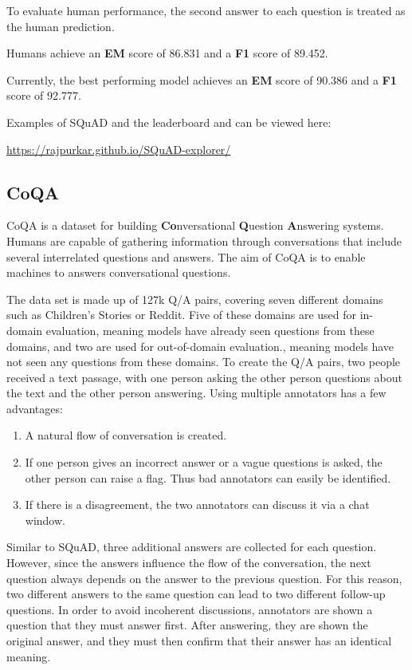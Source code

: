\documentclass[]{krantz}
\providecommand{\tightlist}{%
  \setlength{\itemsep}{0pt}\setlength{\parskip}{0pt}}
\begin{document}
To evaluate human performance, the second answer to each question is treated as the human prediction. \citep{rajpurkar2016squad, rajpurkar2018know}

Humans achieve an \textbf{EM} score of 86.831 and a \textbf{F1} score of 89.452.

Currently, the best performing model achieves an \textbf{EM} score of 90.386 and a \textbf{F1} score of 92.777.

Examples of SQuAD and the leaderboard and can be viewed here:

\center \url{https://rajpurkar.github.io/SQuAD-explorer/}

\flushleft

\hypertarget{coqa}{%
\subsection{CoQA}\label{coqa}}

CoQA is a dataset for building \textbf{Co}nversational \textbf{Q}uestion \textbf{A}nswering systems. Humans are capable of gathering information through conversations that include several interrelated questions and answers. The aim of CoQA is to enable machines to answers conversational questions.

The data set is made up of 127k Q/A pairs, covering seven different domains such as Children's Stories or Reddit. Five of these domains are used for in-domain evaluation, meaning models have already seen questions from these domains, and two are used for out-of-domain evaluation., meaning models have not seen any questions from these domains. To create the Q/A pairs, two people received a text passage, with one person asking the other person questions about the text and the other person answering. Using multiple annotators has a few advantages:

\begin{enumerate}
\def\labelenumi{\arabic{enumi}.}
\tightlist
\item
  A natural flow of conversation is created.
\item
  If one person gives an incorrect answer or a vague questions is asked, the other person can raise a flag. Thus bad annotators can easily be identified.
\item
  If there is a disagreement, the two annotators can discuss it via a chat window.
\end{enumerate}

Similar to SQuAD, three additional answers are collected for each question. However, since the answers influence the flow of the conversation, the next question always depends on the answer to the previous question. For this reason, two different answers to the same question can lead to two different follow-up questions. In order to avoid incoherent discussions, annotators are shown a question that they must answer first. After answering, they are shown the original answer, and they must then confirm that their answer has an identical meaning.
\end{document}

